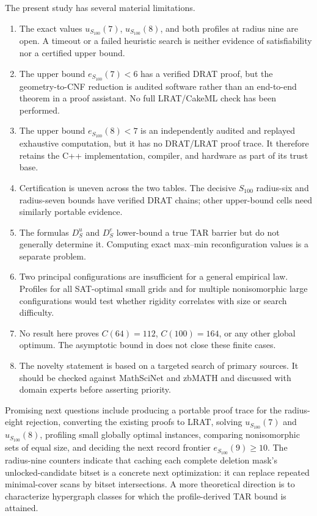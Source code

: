 \documentclass[11pt]{article}
\theoremstyle{definition}
\theoremstyle{remark}
\begin{document}
The present study has several material limitations.
\begin{enumerate}[leftmargin=*]
  \item The exact values $u_{S_{100}}(7)$, $u_{S_{100}}(8)$, and both profiles
  at radius nine are open.  A timeout or a failed heuristic search is neither
  evidence of satisfiability nor a certified upper bound.
  \item The upper bound $e_{S_{100}}(7)<6$ has a verified DRAT proof, but the
  geometry-to-CNF reduction is audited software rather than an end-to-end
  theorem in a proof assistant.  No full LRAT/CakeML check has been performed.
  \item The upper bound $e_{S_{100}}(8)<7$ is an independently audited and
  replayed exhaustive computation, but it has no DRAT/LRAT proof trace.  It
  therefore retains the C++ implementation, compiler, and hardware as part of
  its trust base.
  \item Certification is uneven across the two tables.  The decisive
  $S_{100}$ radius-six and radius-seven bounds have verified DRAT chains; other
  upper-bound cells need similarly portable evidence.
  \item The formulas $D^u_S$ and $D^e_S$ lower-bound a true TAR barrier but do
  not generally determine it.  Computing exact max--min reconfiguration values
  is a separate problem.
  \item Two principal configurations are insufficient for a general empirical
  law.  Profiles for all SAT-optimal small grids and for multiple
  nonisomorphic large configurations would test whether rigidity correlates
  with size or search difficulty.
  \item No result here proves $C(64)=112$, $C(100)=164$, or any other global
  optimum.  The asymptotic bound in \cite{croot2026largesieve} does not close
  these finite cases.
  \item The novelty statement is based on a targeted search of primary sources.
  It should be checked against MathSciNet and zbMATH and discussed with domain
  experts before asserting priority.
\end{enumerate}

Promising next questions include producing a portable proof trace for the
radius-eight rejection, converting the existing proofs to LRAT, solving
$u_{S_{100}}(7)$ and $u_{S_{100}}(8)$, profiling small globally optimal
instances, comparing nonisomorphic sets of equal size, and deciding the next
record frontier $e_{S_{100}}(9)\ge10$.  The radius-nine counters indicate that
caching each complete deletion mask's unlocked-candidate bitset is a concrete
next optimization: it can replace repeated minimal-cover scans by bitset
intersections.  A more
theoretical direction is to characterize hypergraph classes for which the
profile-derived TAR bound is attained.
\end{document}

